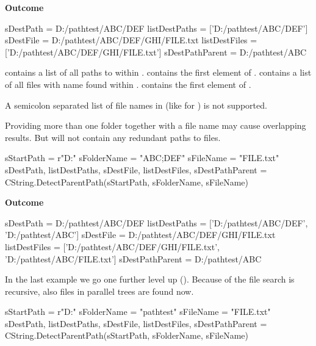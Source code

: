 \textbf{Outcome}

\begin{robotlog}
sDestPath       = D:/pathtest/ABC/DEF
listDestPaths   = ['D:/pathtest/ABC/DEF']
sDestFile       = D:/pathtest/ABC/DEF/GHI/FILE.txt
listDestFiles   = ['D:/pathtest/ABC/DEF/GHI/FILE.txt']
sDestPathParent = D:/pathtest/ABC
\end{robotlog}

 contains a list of all paths to  within .
 contains the first element of .
 contains a list of all files with name  found within .
 contains the first element of .

A semicolon separated list of file names in  (like for ) is not supported.

Providing more than one folder together with a file name may cause overlapping results. But  will not contain
any redundant paths to files.

\begin{pythoncode}
sStartPath  = r"D:\pathtest\ABC\DEF\GHI"
sFolderName = "ABC;DEF"
sFileName   = "FILE.txt"
sDestPath, listDestPaths, sDestFile, listDestFiles, sDestPathParent = CString.DetectParentPath(sStartPath, sFolderName, sFileName)
\end{pythoncode}

\textbf{Outcome}

\begin{robotlog}
sDestPath       = D:/pathtest/ABC/DEF
listDestPaths   = ['D:/pathtest/ABC/DEF', 'D:/pathtest/ABC']
sDestFile       = D:/pathtest/ABC/DEF/GHI/FILE.txt
listDestFiles   = ['D:/pathtest/ABC/DEF/GHI/FILE.txt', 'D:/pathtest/ABC/FILE.txt']
sDestPathParent = D:/pathtest/ABC
\end{robotlog}

In the last example we go one further level up (). Because of the file search is recursive, also files in parallel trees are found now.

\begin{pythoncode}
sStartPath  = r"D:\pathtest\ABC\DEF\GHI"
sFolderName = "pathtest"
sFileName   = "FILE.txt"
sDestPath, listDestPaths, sDestFile, listDestFiles, sDestPathParent = CString.DetectParentPath(sStartPath, sFolderName, sFileName)
\end{pythoncode}

